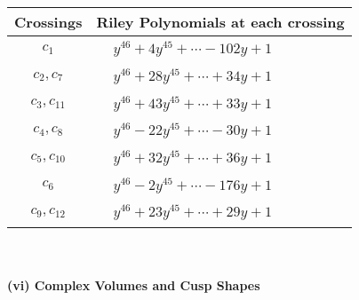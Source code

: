 \documentclass[1p]{elsarticle_modified}
\theoremstyle{definition}
\begin{document}
\begin{tabular}{m{50pt}|m{274pt}}
Crossings & \hspace{64pt}Riley Polynomials at each crossing \\
\hline $$\begin{aligned}c_{1}\end{aligned}$$&$\begin{aligned}
&y^{46}+4 y^{45}+\cdots-102 y+1
\end{aligned}$\\
\hline $$\begin{aligned}c_{2},c_{7}\end{aligned}$$&$\begin{aligned}
&y^{46}+28 y^{45}+\cdots+34 y+1
\end{aligned}$\\
\hline $$\begin{aligned}c_{3},c_{11}\end{aligned}$$&$\begin{aligned}
&y^{46}+43 y^{45}+\cdots+33 y+1
\end{aligned}$\\
\hline $$\begin{aligned}c_{4},c_{8}\end{aligned}$$&$\begin{aligned}
&y^{46}-22 y^{45}+\cdots-30 y+1
\end{aligned}$\\
\hline $$\begin{aligned}c_{5},c_{10}\end{aligned}$$&$\begin{aligned}
&y^{46}+32 y^{45}+\cdots+36 y+1
\end{aligned}$\\
\hline $$\begin{aligned}c_{6}\end{aligned}$$&$\begin{aligned}
&y^{46}-2 y^{45}+\cdots-176 y+1
\end{aligned}$\\
\hline $$\begin{aligned}c_{9},c_{12}\end{aligned}$$&$\begin{aligned}
&y^{46}+23 y^{45}+\cdots+29 y+1
\end{aligned}$\\
\hline
\end{tabular}\\~\\
\newpage\flushleft \textbf{(vi) Complex Volumes and Cusp Shapes}
\end{document}
